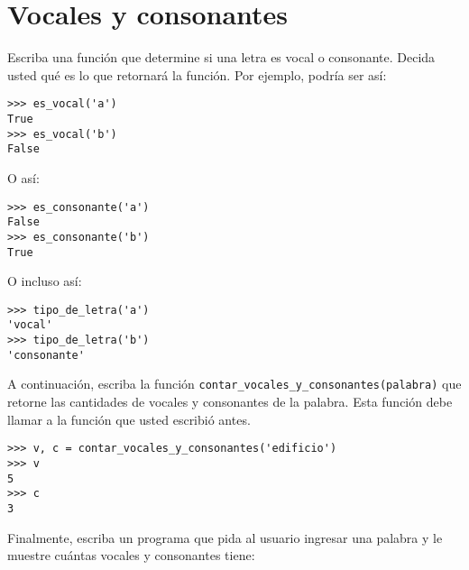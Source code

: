 \section{Vocales y consonantes}

Escriba una función que determine si una letra es vocal o consonante.
Decida usted qué es lo que retornará la función. Por ejemplo, podría ser
así:

\begin{lstlisting}
>>> es_vocal('a')
True
>>> es_vocal('b')
False
\end{lstlisting}

O así:

\begin{lstlisting}
>>> es_consonante('a')
False
>>> es_consonante('b')
True
\end{lstlisting}

O incluso así:

\begin{lstlisting}
>>> tipo_de_letra('a')
'vocal'
>>> tipo_de_letra('b')
'consonante'
\end{lstlisting}

A continuación, escriba la función
\lstinline!contar_vocales_y_consonantes(palabra)! que retorne las
cantidades de vocales y consonantes de la palabra. Esta función debe
llamar a la función que usted escribió antes.

\begin{lstlisting}
>>> v, c = contar_vocales_y_consonantes('edificio')
>>> v
5
>>> c
3
\end{lstlisting}

Finalmente, escriba un programa que pida al usuario ingresar una palabra
y le muestre cuántas vocales y consonantes tiene:
